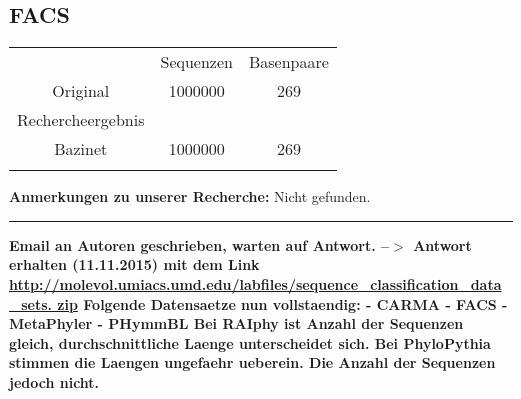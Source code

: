 \documentclass[a4paper, 11pt]{scrartcl}
\begin{document}
\begin{flushleft}
\subsection{FACS}
\begin{tabular}{ccc}
& Sequenzen & Basenpaare \\
Original&1000000&269\\
Rechercheergebnis&&\\
Bazinet&1000000&269\\
&&\\
\end{tabular}
\linebreak
\color{red}
\textbf{Anmerkungen zu unserer Recherche:}\linebreak
Nicht gefunden. 
\linebreak
\linebreak
\noindent\rule{\textwidth}{1pt}
\newpage
\textbf{Email an Autoren geschrieben, warten auf Antwort. --$>$ Antwort erhalten (11.11.2015) mit dem Link \url{http://molevol.umiacs.umd.edu/labfiles/sequence_classification_data_sets.
zip} \linebreak
Folgende Datensaetze nun vollstaendig:\linebreak
- CARMA\linebreak
- FACS\linebreak
- MetaPhyler\linebreak
- PHymmBL\linebreak
Bei RAIphy ist Anzahl der Sequenzen gleich, durchschnittliche Laenge unterscheidet sich.\linebreak
Bei PhyloPythia stimmen die Laengen ungefaehr ueberein. Die Anzahl der Sequenzen jedoch nicht.}
\newpage


\end{flushleft}
\end{document}
